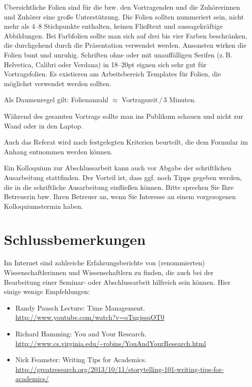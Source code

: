 \documentclass[
    fontsize=12pt,
    headings=small,
    parskip=half,           %
    bibliography=totoc,
    numbers=noenddot,       %
    open=any,               %
    ]{scrreprt}
\begin{document}
Übersichtliche Folien sind für die bzw. den Vortragenden und die Zuhörerinnen und Zuhörer eine große Unterstützung. Die Folien sollten nummeriert sein, nicht mehr als 4--8 Stichpunkte enthalten, keinen Fließtext und aussagekräftige Abbildungen. Bei Farbfolien sollte man sich auf drei bis vier Farben beschränken, die durchgehend durch die Präsentation verwendet werden. Ansonsten wirken die Folien bunt und unruhig. Schriften ohne oder mit unauffälligen Serifen (z.\,B. Helvetica, Calibri oder Verdana) in 18--20pt eignen sich sehr gut für Vortragsfolien. Es existieren am Arbeitsbereich Templates für Folien, die möglichst verwendet werden sollten.

Als Daumenregel gilt: Folienanzahl $\approx$ Vortragszeit$\,/\,$3 Minuten.

Während des gesamten Vortrags sollte man ins Publikum schauen und nicht zur Wand oder in den Laptop.

Auch das Referat wird nach festgelegten Kriterien beurteilt, die dem Formular im Anhang entnommen werden können.

Ein Kolloquium zur Abschlussarbeit kann auch vor Abgabe der schriftlichen Ausarbeitung stattfinden. Der Vorteil ist, dass ggf. noch Tipps gegeben werden, die in die schriftliche Ausarbeitung einfließen können. Bitte sprechen Sie Ihre Betreuerin bzw. Ihren Betreuer an, wenn Sie Interesse an einem vorgezogenen Kolloquiumstermin haben.

\chapter{Schlussbemerkungen}

Im Internet sind zahlreiche Erfahrungsberichte von (renommierten) Wissenschaftlerinnen und Wissenschaftlern zu finden, die auch bei der Bearbeitung einer Seminar- oder Abschlussarbeit hilfreich sein können. Hier einige wenige Empfehlungen:

\begin{itemize}
	\item Randy Pausch Lecture: Time Management. \\ \url{http://www.youtube.com/watch?v=oTugjssqOT0}
	\item Richard Hamming: You and Your Research. \\ \url{http://www.cs.virginia.edu/~robins/YouAndYourResearch.html}
	\item Nick Feamster: Writing Tips for Academics. \\ \url{http://greatresearch.org/2013/10/11/storytelling-101-writing-tips-for-academics/}
\end{itemize}
\end{document}

